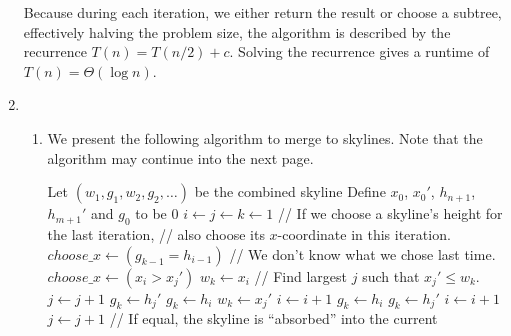 \documentclass{article}
\begin{document}
\begin{enumerate}
    Because during each iteration, we either return the result or choose a subtree, effectively halving the problem size, the algorithm is described by the recurrence $T(n) = T(n/2) + c$. Solving the recurrence gives a runtime of $T(n) = \Theta(\log n)$.

    \item
    \begin{enumerate}
        \item We present the following algorithm to merge to skylines. Note that the algorithm may continue into the next page.
        \begin{algorithmic}[1]
            \State Let $(w_1, g_1, w_2, g_2, \dots)$ be the combined skyline
            \State Define $x_0$, $x_0'$, $h_{n + 1}$, $h_{m + 1}'$ and $g_0$ to be 0
            \State $i \gets j \gets k \gets 1$
            \Repeat
                        \State // If we choose a skyline's height for the last iteration,
                        \State // also choose its $x$-coordinate in this iteration.
                        \State $choose\_x \gets (g_{k - 1} = h_{i - 1})$
                    \Else
                        \State // We don't know what we chose last time.
                        \State $choose\_x \gets (x_i > x_j')$
                    \EndIf
                        \State $w_k \gets x_i$
                        \State // Find largest $j$ such that $x_j' \le w_k$.
                            \State $j \gets j + 1$
                        \EndWhile
                            \State $g_k \gets h_j'$
                        \Else
                            \State $g_k \gets h_i$
                        \EndIf
                    \Else
                        \State $w_k \gets x_j'$
                            \State $i \gets i + 1$
                        \EndWhile
                            \State $g_k \gets h_i$
                        \Else
                            \State $g_k \gets h_j'$
                        \EndIf
                    \EndIf
                    \State $i \gets i + 1$
                    \State $j \gets j + 1$
                \Else
                        \State // If equal, the skyline is ``absorbed'' into the current

\end{algorithmic}
\end{enumerate}
\end{enumerate}
\end{document}
